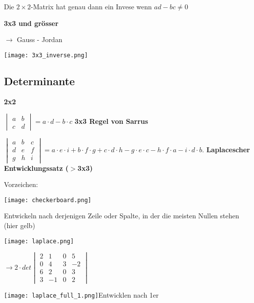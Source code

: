 \begin{multicols*}{3}
    {Die $2\times2$-Matrix hat genau dann ein Invese wenn $ad-bc \neq 0$}

    \textbf{3x3 und grösser}

    {$\rightarrow$ Gauss - Jordan}

    \texttt{[image: 3x3\_inverse.png]}
    \WhiteSpace

    \subsection{Determinante}
    {\textbf{2x2}}

    $\begin{vmatrix}
            a & b \\
            c & d
        \end{vmatrix} = a\cdot d - b\cdot c $
    \WhiteSpace
    \textbf{3x3 Regel von Sarrus}

    $\begin{vmatrix} a & b & c \\ d & e & f \\ g & h &i \end{vmatrix} = a \cdot e \cdot i + b \cdot f \cdot g + c \cdot d \cdot h - g \cdot e \cdot c - h \cdot f \cdot a - i \cdot d \cdot b.$
    \WhiteSpace
    \textbf{Laplacescher Entwicklungssatz ($ >$3x3)}

    {\begin{multicols}{2}
            Vorzeichen:

            \columnbreak
            { \texttt{[image: checkerboard.png]} }

        \end{multicols}}

    {{Entwickeln nach derjenigen Zeile oder Spalte, in
                der die meisten Nullen stehen (hier gelb)}}
    {\begin{multicols}{2}
            {\texttt{[image: laplace.png]}}
            \columnbreak

            {  $ \rightarrow  2 \cdot det \begin{vmatrix} 2 & 1 & 0 & 5 \\ 0 & 4 & 3 & -2 \\ 6 & 2 &0 & 3 \\ 3 & -1 &0 & 2 \end{vmatrix} $}
        \end{multicols}}

    {\texttt{[image: laplace\_full\_1.png]}Entwicklen nach 1er}


\end{multicols*}
